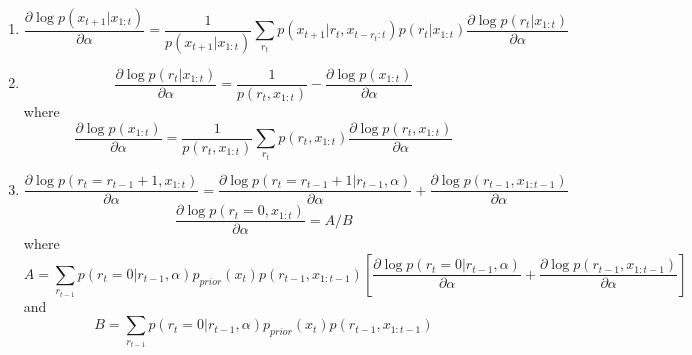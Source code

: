 \documentclass{article}
\begin{document}
\begin{enumerate}
\item
\[
\frac{\partial \log p(x_{t+1}|x_{1:t})}{\partial \alpha} = \frac{1}{p(x_{t+1}|x_{1:t})} \sum_{r_{t}} p(x_{t+1}|r_{t},x_{t-r_{t}:t}) p(r_{t}|x_{1:t}) \frac{\partial \log p(r_{t}|x_{1:t})}{\partial \alpha}
\]
\item
\[
\frac{\partial \log p(r_{t}|x_{1:t})}{\partial \alpha} = \frac{1}{p(r_{t},x_{1:t})} - \frac{\partial \log p(x_{1:t})}{\partial \alpha}
\]
where 
\[
\frac{\partial \log p(x_{1:t})}{\partial \alpha} = \frac{1}{p(r_{t},x_{1:t})} \sum_{r_{t}} p(r_{t},x_{1:t}) \frac{\partial \log p(r_{t},x_{1:t})}{\partial \alpha}
\]
\item
\[
\frac{\partial \log p(r_{t}=r_{t-1}+1,x_{1:t})}{\partial \alpha} = \frac{\partial \log p(r_{t}=r_{t-1}+1|r_{t-1},\alpha)}{\partial \alpha} + \frac{\partial \log p(r_{t-1},x_{1:t-1})}{\partial \alpha}
\]
\[
\frac{\partial \log p(r_{t}=0,x_{1:t})}{\partial \alpha} = A/B
\]
where
\[
A = \sum_{r_{t-1}} p(r_{t}=0|r_{t-1},\alpha)p_{prior}(x_{t})p(r_{t-1},x_{1:t-1})\left[\frac{\partial \log p(r_{t}=0|r_{t-1},\alpha)}{\partial \alpha} + \frac{\partial \log p(r_{t-1},x_{1:t-1})}{\partial \alpha} \right]
\]
and
\[
B = \sum_{r_{t-1}} p(r_{t}=0|r_{t-1},\alpha)p_{prior}(x_{t})p(r_{t-1},x_{1:t-1})
\]
\end{enumerate}
\end{document}
